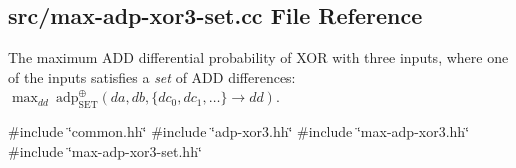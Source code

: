 \hypertarget{max-adp-xor3-set_8cc}{\subsection{src/max-\/adp-\/xor3-\/set.cc \-File \-Reference}
\label{max-adp-xor3-set_8cc}
}


\-The maximum \-A\-D\-D differential probability of \-X\-O\-R with three inputs, where one of the inputs satisfies a {\itshape set\/} of \-A\-D\-D differences\-: $\max_{dd}~\mathrm{adp}^{\oplus}_{\mathrm{SET}}(da, db, \{{dc}_0, {dc}_1, \ldots\} \rightarrow dd)$.  


{\ttfamily \#include \char`\"{}common.\-hh\char`\"{}}\*
{\ttfamily \#include \char`\"{}adp-\/xor3.\-hh\char`\"{}}\*
{\ttfamily \#include \char`\"{}max-\/adp-\/xor3.\-hh\char`\"{}}\*
{\ttfamily \#include \char`\"{}max-\/adp-\/xor3-\/set.\-hh\char`\"{}}\*
